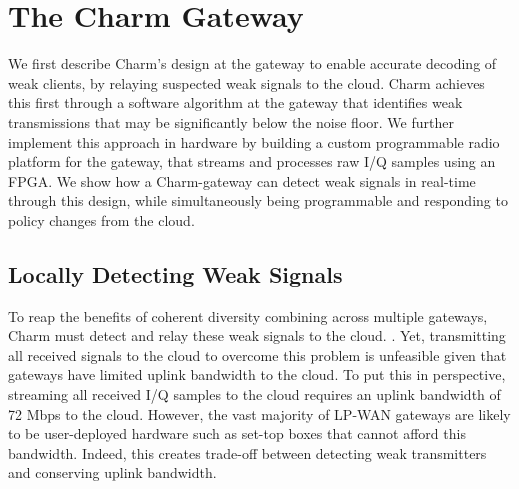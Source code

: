 \section{The Charm Gateway}
\label{sec:gateway}



We first describe Charm's design at the gateway to enable accurate decoding of
weak clients, by relaying suspected weak signals to the cloud. Charm achieves
this first through a software algorithm at the gateway that identifies weak
transmissions that may be significantly below the noise floor. We further
implement this approach in hardware by building a custom programmable radio
platform for the gateway, that streams and processes raw I/Q samples using an
FPGA. We show how a Charm-gateway can detect weak signals in real-time through
this design, while simultaneously being programmable and responding to policy
changes from the cloud.

\subsection{Locally Detecting Weak Signals}
\label{sec:local-detection}

To reap the benefits of coherent diversity combining across multiple gateways,
Charm must detect and relay these weak signals to the cloud. . Yet,
transmitting all received signals to the cloud to overcome this problem is
unfeasible given that gateways have limited uplink bandwidth to the cloud. To
put this in perspective, streaming all received I/Q samples to the cloud
requires an uplink bandwidth of 72 Mbps to the cloud. However, the vast
majority of LP-WAN gateways are likely to be user-deployed hardware such as
set-top boxes that cannot afford this bandwidth. Indeed, this creates
trade-off between detecting weak transmitters and conserving uplink
bandwidth.

